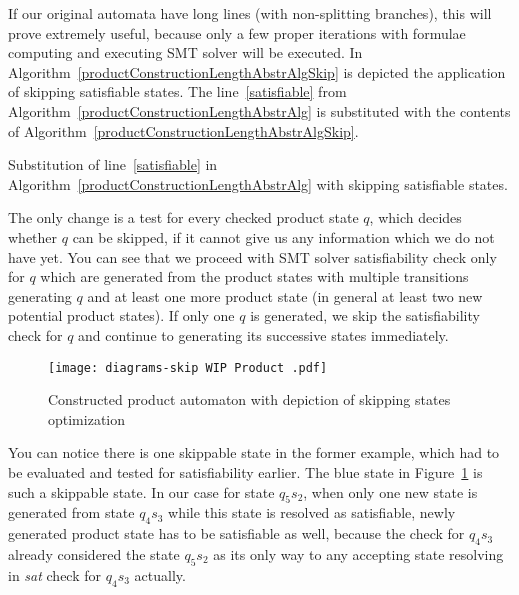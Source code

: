 If our original automata have long lines (with non-splitting branches), this will prove extremely useful, because only a few proper iterations with formulae computing and executing SMT solver will be executed. In Algorithm~\ref{productConstructionLengthAbstrAlgSkip} is depicted the application of skipping satisfiable states. The line~\ref{satisfiable} from Algorithm~\ref{productConstructionLengthAbstrAlg} is substituted with the contents of Algorithm~\ref{productConstructionLengthAbstrAlgSkip}.


\begin{algorithm}
    \caption{Substitution of line~\ref{satisfiable} in Algorithm~\ref{productConstructionLengthAbstrAlg} with skipping satisfiable states.} \label{productConstructionLengthAbstrAlgSkip}
    \DontPrintSemicolon
\end{algorithm}\DecMargin{1em}

The only change is a test for every checked product state $q$, which decides whether $q$ can be skipped, if it cannot give us any information which we do not have yet. You can see that we proceed with SMT solver satisfiability check only for $q$ which are generated from the product states with multiple transitions generating $q$ and at least one more product state (in general at least two new potential product states). If only one $q$ is generated, we skip the satisfiability check for $q$ and continue to generating its successive states immediately.

\begin{figure}[ht]
	\centering
	\texttt{[image: diagrams-skip WIP Product .pdf]}
	\caption{Constructed product automaton with depiction of skipping states optimization}
	\label{fig:wip_skip_product}
\end{figure}

You can notice there is one skippable state in the former example, which had to be evaluated and tested for satisfiability earlier. The blue state in Figure~\ref{fig:wip_skip_product} is such a skippable state. In our case for state $q_5s_2$, when only one new state is generated from state $q_4s_3$ while this state is resolved as satisfiable, newly generated product state has to be satisfiable as well, because the check for $q_4s_3$ already considered the state $q_5s_2$ as its only way to any accepting state resolving in \emph{sat} check for $q_4s_3$ actually.

